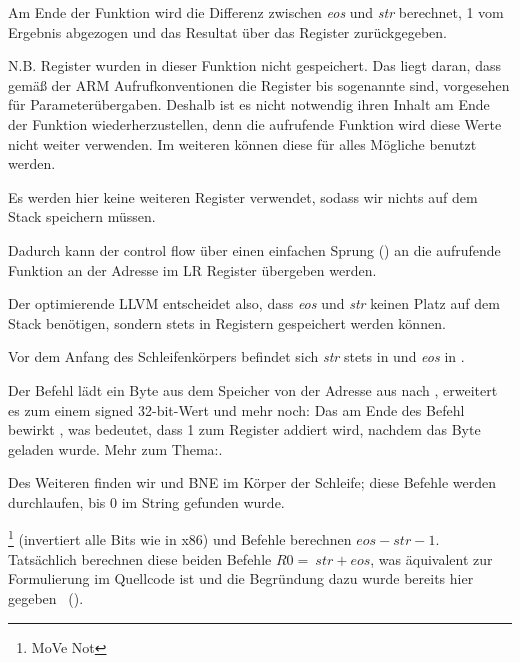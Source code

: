 Am Ende der Funktion wird die Differenz zwischen \emph{eos} und \emph{str}
berechnet, 1 vom Ergebnis abgezogen und das Resultat über das Register 
zurückgegeben.

N.B. Register wurden in dieser Funktion nicht gespeichert.
Das liegt daran, dass gemäß der ARM Aufrufkonventionen die Register  bis
 sogenannte  sind, vorgesehen für Parameterübergaben.
Deshalb ist es nicht notwendig ihren Inhalt am Ende der Funktion
wiederherzustellen, denn die aufrufende Funktion wird diese Werte nicht weiter
verwenden. 
Im weiteren können diese für alles Mögliche benutzt werden.

Es werden hier keine weiteren Register verwendet, sodass wir nichts auf dem
Stack speichern müssen. 

Dadurch kann der control flow über einen einfachen Sprung () an die
aufrufende Funktion an der Adresse im \ac{LR} Register übergeben werden.

\mysubparagraph{\OptimizingXcodeIV (\ThumbMode)}


Der optimierende LLVM entscheidet also, dass \emph{eos} und \emph{str} keinen Platz
auf dem Stack benötigen, sondern stets in Registern gespeichert werden können. 

Vor dem Anfang des Schleifenkörpers befindet sich \emph{str} stets in  und
\emph{eos} in .

Der Befehl  lädt ein Byte aus dem Speicher von der
Adresse aus  nach , erweitert es zum einem signed 32-bit-Wert und
mehr noch: Das  am Ende des Befehl bewirkt ,
was bedeutet, dass 1 zum Register  addiert wird, nachdem das Byte geladen
wurde.
Mehr zum Thema:. 

Des Weiteren finden wir \CMP und \ac{BNE} im Körper der Schleife; diese Befehle
werden durchlaufen, bis 0 im String gefunden wurde.

\footnote{MoVe Not} (invertiert alle Bits wie \NOT in x86) und \ADD
Befehle berechnen $eos - str - 1$.
Tatsächlich berechnen diese beiden Befehle $R0 =
~str + eos$, was äquivalent zur Formulierung im Quellcode ist und die Begründung
dazu wurde bereits hier gegeben ~().

